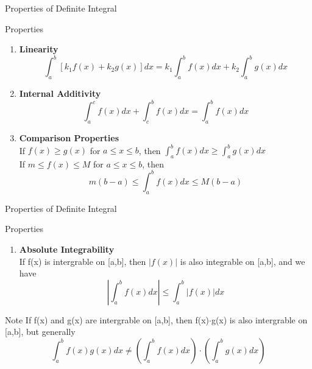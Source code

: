 \begin{frame}{Properties of Definite Integral}
    \begin{block}{Properties}
        \begin{enumerate}
            \item \textbf{Linearity}
                  \begin{equation*}
                      \int_a^b [k_1f(x)+k_2g(x)]dx = k_1\int_a^b f(x)dx + k_2\int_a^b g(x)dx
                  \end{equation*}
            \item \textbf{Internal Additivity}
                  \begin{equation*}
                      \int_a^c f(x)dx + \int_c^b f(x)dx = \int_a^b f(x)dx
                  \end{equation*}
            \item \textbf{Comparison Properties} \\
                  If $f(x) \geq g(x)$ for $a \leq x \leq b$, then $\int_a^b f(x)dx \geq \int_a^b g(x)dx$ \\
                  If $m\leq f(x) \leq M$ for $a \leq x \leq b$, then
                  \begin{equation*}
                      m(b-a) \leq \int_a^b f(x)dx \leq M(b-a)
                  \end{equation*}
        \end{enumerate}
    \end{block}

\end{frame}

\begin{frame}{Properties of Definite Integral}
    \begin{block}{Properties}
        \begin{enumerate}[4]
            \item \textbf{Absolute Integrability}\\
                  If f(x) is intergrable on [a,b], then $|f(x)|$ is also integrable on [a,b], and we have
                  \begin{equation*}
                      |\int_a^b f(x) dx | \leq \int_a^b |f(x)|dx
                  \end{equation*}
        \end{enumerate}
    \end{block}
    \begin{block}{Note}
        If f(x) and g(x) are intergrable on [a,b], then f(x)$\cdot$g(x) is also intergrable on [a,b], but generally
        \begin{equation*}
            \int_a^b f(x)g(x)dx \neq (\int_a^b f(x)dx) \cdot (\int_a^b g(x)dx)
        \end{equation*}
    \end{block}
\end{frame}


